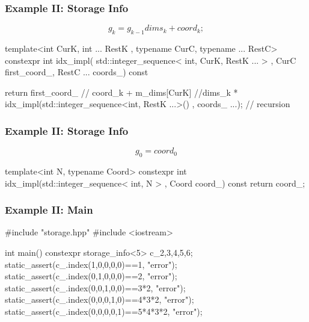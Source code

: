 \documentclass[aspectratio=43]{beamer}
\begin{document}
\begin{frame}[fragile]\frametitle{Example II: Storage Info}
  $$
      g_k = g_{k-1} dims_{k} + coord_{k};
  $$
  \begin{Cpplisting}{}
template<int CurK, int ... RestK
         , typename CurC, typename ... RestC>
constexpr int idx_impl(
        std::integer_sequence< int,  CurK, RestK ... >
        , CurC first_coord_, RestC ... coords_) const {

  return first_coord_ // coord_k
  + m_dims[CurK] //dims_k
  * idx_impl(std::integer_sequence<int, RestK ...>()
             , coords_ ...); // recursion
}
  \end{Cpplisting}
\end{frame}


\begin{frame}[fragile]\frametitle{Example II: Storage Info}
$$
  g_0 = coord_0
$$
  \begin{Cpplisting}{}
template<int N, typename Coord>
constexpr int idx_impl(std::integer_sequence< int, N > , Coord coord_) const{
  return coord_;
}
  \end{Cpplisting}
\end{frame}


\begin{frame}[fragile]\frametitle{Example II: Main}
  \begin{Cpplisting}[: main ]{}
#include "storage.hpp"
#include <iostream>

int main(){
    constexpr storage_info<5> c_{2,3,4,5,6};
    static_assert(c_.index(1,0,0,0,0)==1, "error");
    static_assert(c_.index(0,1,0,0,0)==2, "error");
    static_assert(c_.index(0,0,1,0,0)==3*2, "error");
    static_assert(c_.index(0,0,0,1,0)==4*3*2, "error");
    static_assert(c_.index(0,0,0,0,1)==5*4*3*2, "error");
}
  \end{Cpplisting}
\end{frame}
\end{document}
